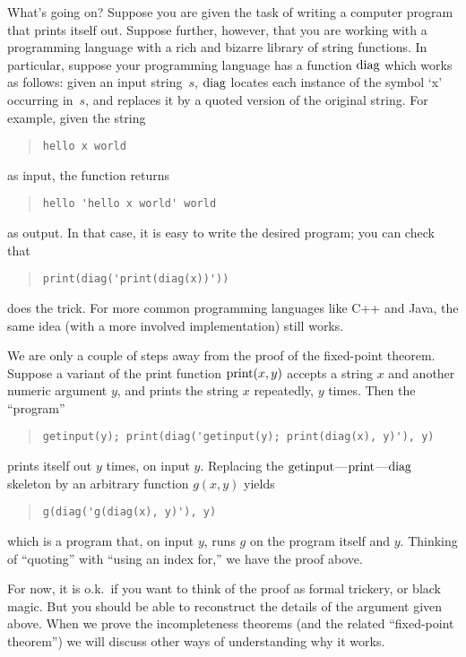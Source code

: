 \documentclass[../../../include/open-logic-section]{subfiles}
\begin{document}
\begin{explain}
What's going on? Suppose you are given the task of writing a computer
program that prints itself out. Suppose further, however, that you are
working with a programming language with a rich and bizarre library of
string functions. In particular, suppose your programming language has
a function $\mathrm{diag}$ which works as follows: given an input
string~$s$, $\mathrm{diag}$ locates each instance of the symbol `x'
occurring in~$s$, and replaces it by a quoted version of the original
string. For example, given the string
\begin{quote}
\begin{verbatim}
hello x world
\end{verbatim}
\end{quote}
as input, the function returns
\begin{quote}
\begin{verbatim}
hello 'hello x world' world
\end{verbatim}
\end{quote}
as output. In that case, it is easy to write the desired program; you
can check that
\begin{quote}
\begin{verbatim}
print(diag('print(diag(x))'))
\end{verbatim}
\end{quote}
does the trick. For more common programming languages like C++ and
Java, the same idea (with a more involved implementation) still works.

We are only a couple of steps away from the proof of the fixed-point
theorem. Suppose a variant of the print function $\mathrm{print}(x,y)$
accepts a string $x$ and another numeric argument $y$, and prints the
string $x$ repeatedly, $y$ times. Then the ``program''
\begin{quote}
\begin{verbatim}
getinput(y); print(diag('getinput(y); print(diag(x), y)'), y)
\end{verbatim}
\end{quote}
prints itself out $y$ times, on input $y$. Replacing the
$\mathrm{getinput}$---$\mathrm{print}$---$\mathrm{diag}$ skeleton by an
arbitrary function $g(x,y)$ yields
\begin{quote}
\begin{verbatim}
g(diag('g(diag(x), y)'), y)
\end{verbatim}
\end{quote}
which is a program that, on input $y$, runs $g$ on the program itself
and $y$. Thinking of ``quoting'' with ``using an index for,'' we have
the proof above.

For now, it is o.k.\ if you want to think of the proof as formal
trickery, or black magic. But you should be able to reconstruct the
details of the argument given above. When we prove the incompleteness
theorems (and the related ``fixed-point theorem'') we will discuss
other ways of understanding why it works.
\end{explain}
\end{document}
